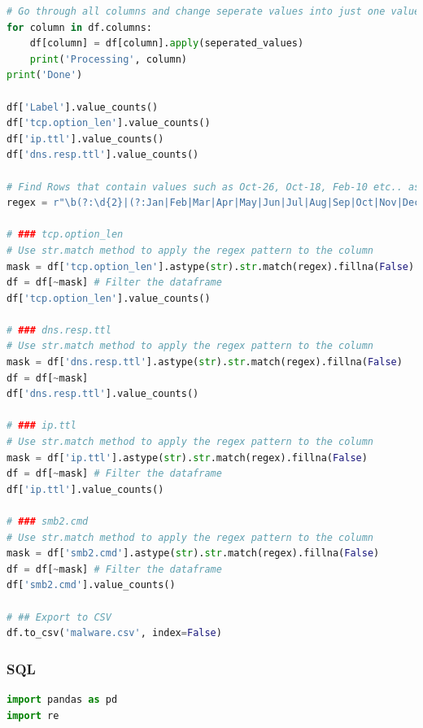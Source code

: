 \begin{appendices}
\begin{lstlisting}[language=Python]
# Go through all columns and change seperate values into just one value
for column in df.columns:
    df[column] = df[column].apply(seperated_values)
    print('Processing', column)
print('Done')

df['Label'].value_counts()
df['tcp.option_len'].value_counts()
df['ip.ttl'].value_counts()
df['dns.resp.ttl'].value_counts()

# Find Rows that contain values such as Oct-26, Oct-18, Feb-10 etc.. as these appear to be invalid and we will drop these rows.
regex = r"\b(?:\d{2}|(?:Jan|Feb|Mar|Apr|May|Jun|Jul|Aug|Sep|Oct|Nov|Dec))-(?:\d{2}|(?:Jan|Feb|Mar|Apr|May|Jun|Jul|Aug|Sep|Oct|Nov|Dec))\b"

# ### tcp.option_len
# Use str.match method to apply the regex pattern to the column
mask = df['tcp.option_len'].astype(str).str.match(regex).fillna(False)
df = df[~mask] # Filter the dataframe
df['tcp.option_len'].value_counts()

# ### dns.resp.ttl
# Use str.match method to apply the regex pattern to the column
mask = df['dns.resp.ttl'].astype(str).str.match(regex).fillna(False)
df = df[~mask]
df['dns.resp.ttl'].value_counts()

# ### ip.ttl
# Use str.match method to apply the regex pattern to the column
mask = df['ip.ttl'].astype(str).str.match(regex).fillna(False)
df = df[~mask] # Filter the dataframe
df['ip.ttl'].value_counts()

# ### smb2.cmd
# Use str.match method to apply the regex pattern to the column
mask = df['smb2.cmd'].astype(str).str.match(regex).fillna(False)
df = df[~mask] # Filter the dataframe
df['smb2.cmd'].value_counts()

# ## Export to CSV
df.to_csv('malware.csv', index=False)	
\end{lstlisting}

\subsubsection*{SQL}
\begin{lstlisting}[language=Python]
import pandas as pd
import re


\end{lstlisting}
\end{appendices}
